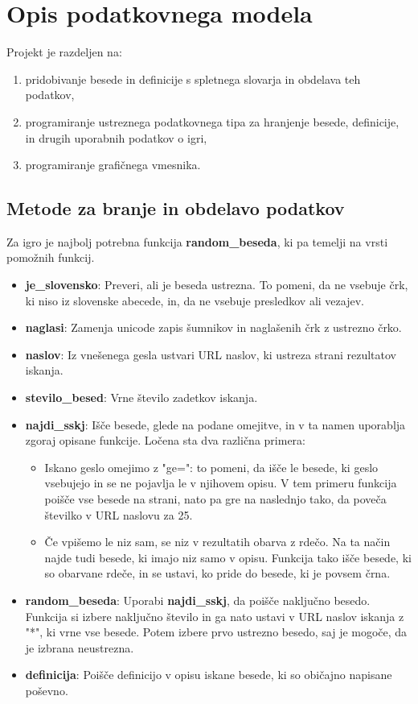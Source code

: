 \documentclass [a4paper, 12pt] {article}
\begin{document}
\section {Opis podatkovnega modela}
Projekt je razdeljen na:
\begin {enumerate}
\item pridobivanje besede in definicije s spletnega slovarja in obdelava teh podatkov,
\item programiranje ustreznega podatkovnega tipa za hranjenje besede, definicije, in drugih uporabnih podatkov o igri,
\item programiranje grafičnega vmesnika.
\end {enumerate}

\subsection {Metode za branje in obdelavo podatkov}
Za igro je najbolj potrebna funkcija \textbf {random\_beseda}, ki pa temelji na vrsti pomožnih funkcij.
\begin {itemize}
\item \textbf {je\_slovensko}: Preveri, ali je beseda ustrezna. To pomeni, da ne vsebuje črk, ki niso iz slovenske abecede, in, da ne vsebuje presledkov ali vezajev.
\item \textbf {naglasi}: Zamenja unicode zapis šumnikov in naglašenih črk z ustrezno črko.
\item \textbf {naslov}: Iz vnešenega gesla ustvari URL naslov, ki ustreza strani rezultatov iskanja.
\item \textbf {stevilo\_besed}: Vrne število zadetkov iskanja.
\item \textbf {najdi\_sskj}: Išče besede, glede na podane omejitve, in v ta namen uporablja zgoraj opisane funkcije. Ločena sta dva različna primera:
\begin {itemize}
\item Iskano geslo omejimo z "ge=": to pomeni, da išče le besede, ki geslo vsebujejo in se ne pojavlja le v njihovem opisu. V tem primeru funkcija poišče vse besede na strani, nato pa gre na naslednjo tako, da poveča številko v URL naslovu za 25.
\item Če vpišemo le niz sam, se niz v rezultatih obarva z rdečo. Na ta način najde tudi besede, ki imajo niz samo v opisu. Funkcija tako išče besede, ki so obarvane rdeče, in se ustavi, ko pride do besede, ki je povsem črna.
\end {itemize}
\item \textbf {random\_beseda}: Uporabi \textbf {najdi\_sskj}, da poišče naključno besedo. Funkcija si izbere naključno število in ga nato ustavi v URL naslov iskanja z "*", ki vrne vse besede. Potem izbere prvo ustrezno besedo, saj je mogoče, da je izbrana neustrezna.
\item \textbf {definicija}: Poišče definicijo v opisu iskane besede, ki so običajno napisane poševno.
\end {itemize} 
\end{document}
